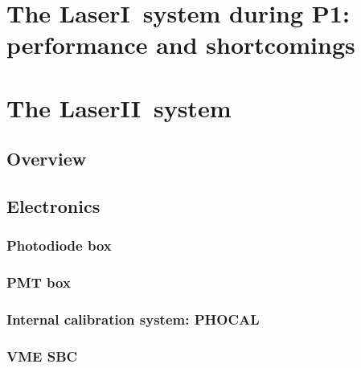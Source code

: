 \documentclass[UKenglish,texlive=2013]{\ATLASLATEXPATH atlasdoc}
\newcommand{\lasi}{LaserI}
\newcommand{\lasii}{LaserII}
\begin{document}
\section{The \lasi~system during P1: performance and shortcomings}
\label{sec:detector}



\section{The \lasii~system}
\label{sec:result}

\subsection{Overview}



\subsection{Electronics}

\subsubsection{Photodiode box}
\label{photodiodebox}



\subsubsection{PMT box}
\label{pmtbox}



\subsubsection{Internal calibration system: PHOCAL}



\subsubsection{VME SBC}


\end{document}
